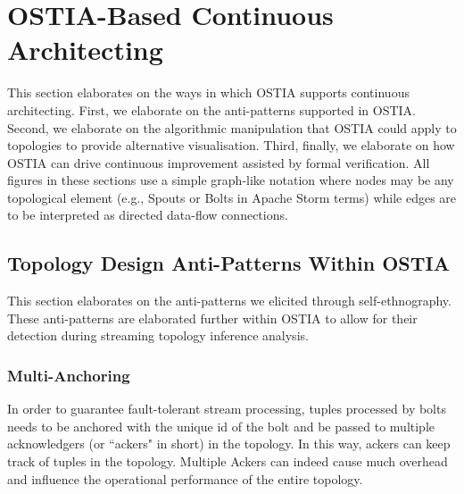 \section{OSTIA-Based Continuous Architecting}
This section elaborates on the ways in which OSTIA supports continuous architecting. First, we elaborate on the anti-patterns supported in OSTIA. Second,  we elaborate on the algorithmic manipulation that OSTIA could apply to topologies to provide alternative visualisation. Third, finally, we elaborate on how OSTIA can drive continuous improvement assisted by formal verification. All figures in these sections use a simple graph-like notation where nodes may be any topological element (e.g., Spouts or Bolts in Apache Storm terms) while edges are to be interpreted as directed data-flow connections.


\subsection{Topology Design Anti-Patterns Within OSTIA}\label{sec:anti-pattern}
This section elaborates on the anti-patterns we elicited through self-ethnography. These anti-patterns are elaborated further within OSTIA to allow for their detection during streaming topology inference analysis.

\subsubsection{Multi-Anchoring}
In order to guarantee fault-tolerant stream processing, tuples processed by bolts needs to be anchored with the unique id of the bolt and be passed to multiple acknowledgers (or ``ackers" in short) in the topology. In this way, ackers can keep track of tuples in the topology. Multiple Ackers can indeed cause much overhead and influence the operational performance of the entire topology.


